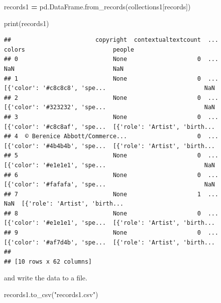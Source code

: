 \documentclass[
]{book}
\newenvironment{Shaded}{\begin{snugshade}}{\end{snugshade}}
\newcommand{\BuiltInTok}[1]{#1}
\newcommand{\NormalTok}[1]{#1}
\newcommand{\OperatorTok}[1]{\textcolor[rgb]{0.81,0.36,0.00}{\textbf{#1}}}
\newcommand{\StringTok}[1]{\textcolor[rgb]{0.31,0.60,0.02}{#1}}
\begin{document}
\begin{Shaded}
\begin{Highlighting}[]
\NormalTok{records1 }\OperatorTok{=}\NormalTok{ pd.DataFrame.from\_records(collections1[}\StringTok{\textquotesingle{}records\textquotesingle{}}\NormalTok{])}
\end{Highlighting}
\end{Shaded}

\begin{Shaded}
\begin{Highlighting}[]
\BuiltInTok{print}\NormalTok{(records1)}
\end{Highlighting}
\end{Shaded}

\begin{verbatim}
##                        copyright  contextualtextcount  ...                         colors                         people
## 0                           None                    0  ...                            NaN                            NaN
## 1                           None                    0  ...  [{'color': '#c8c8c8', 'spe...                            NaN
## 2                           None                    0  ...  [{'color': '#323232', 'spe...                            NaN
## 3                           None                    0  ...  [{'color': '#c8c8af', 'spe...  [{'role': 'Artist', 'birth...
## 4  © Berenice Abbott/Commerce...                    0  ...  [{'color': '#4b4b4b', 'spe...  [{'role': 'Artist', 'birth...
## 5                           None                    0  ...  [{'color': '#e1e1e1', 'spe...                            NaN
## 6                           None                    0  ...  [{'color': '#fafafa', 'spe...                            NaN
## 7                           None                    1  ...                            NaN  [{'role': 'Artist', 'birth...
## 8                           None                    0  ...  [{'color': '#e1e1e1', 'spe...  [{'role': 'Artist', 'birth...
## 9                           None                    0  ...  [{'color': '#af7d4b', 'spe...  [{'role': 'Artist', 'birth...
## 
## [10 rows x 62 columns]
\end{verbatim}

and write the data to a file.

\begin{Shaded}
\begin{Highlighting}[]
\NormalTok{records1.to\_csv(}\StringTok{"records1.csv"}\NormalTok{)}
\end{Highlighting}
\end{Shaded}
\end{document}
